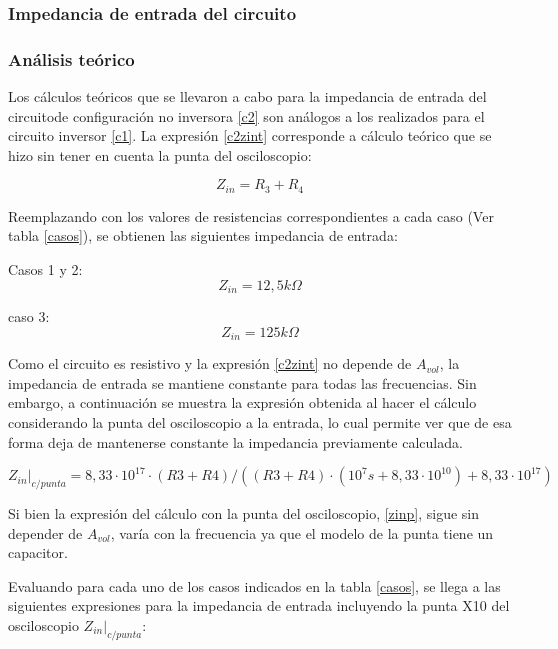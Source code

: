 \subsubsection{Impedancia de entrada del circuito}%

\subsubsection*{An\'alisis te\'orico} %
Los c\'alculos te\'oricos que se llevaron a cabo para la impedancia de entrada del circuitode configuraci\'on no inversora \ref{c2} son an\'alogos a los realizados para el circuito inversor \ref{c1}. La expresi\'on \ref{c2zint} corresponde a c\'alculo te\'orico que se hizo sin tener en cuenta la punta del osciloscopio:

\begin{equation}
	Z_{in} =  R_3 + R_4
	\label{c2zint}
\end{equation}

Reemplazando con los valores de resistencias correspondientes a cada caso (Ver tabla \ref{casos}), se obtienen las siguientes impedancia de entrada:

Casos 1 y 2:
\begin{equation}
	Z_{in} =  12,5k\Omega
	\label{c2c1zint}
\end{equation}

caso 3:
\begin{equation}
	Z_{in} =  125k\Omega
	\label{c3c3zint}
\end{equation}

Como el circuito es resistivo y la expresi\'on \ref{c2zint} no depende de $A_{vol}$, la impedancia de entrada se mantiene constante para todas las frecuencias. Sin embargo, a continuaci\'on se muestra la expresi\'on obtenida al hacer el c\'alculo considerando la punta del osciloscopio a la entrada, lo cual permite ver que de esa forma deja de mantenerse constante la impedancia previamente calculada.


\begin{equation}
	Z_{in}\rvert_{c/punta} = 8,33 \cdot 10^{17} \cdot (R3 + R4)/((R3 + R4) \cdot (10^7 s + 8,33 \cdot 10^{10}) + 8,33 \cdot 10^{17})
	\label{zinp}
\end{equation}

Si bien la expresi\'on del c\'alculo con la punta del osciloscopio, \ref{zinp}, sigue sin depender de $A_{vol}$, var\'ia con la frecuencia ya que el modelo de la punta tiene un capacitor.

Evaluando para cada uno de los casos indicados en la tabla \ref{casos}, se llega a las siguientes expresiones para la impedancia de entrada incluyendo la punta X10 del osciloscopio $Z_{in}\rvert_{c/punta}$:

